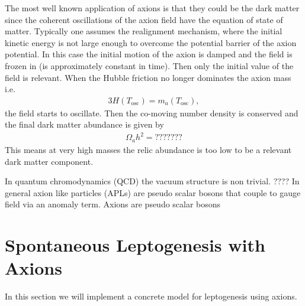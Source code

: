 \documentclass[13pt,a4paper,twoside,titlepage]{article}
\begin{document}
The most well known application of axions is that they could be the dark matter since
the coherent oscillations of the axion field have the equation of state of matter.
Typically one assumes the realignment mechanism, where the initial kinetic energy is not large enough to overcome the potential barrier of the axion potential. In this case the initial motion of the axion is damped and the field is frozen in (is approximately constant in time). Then only the initial value of the field is relevant.
When the Hubble friction no longer dominates the axion mass i.e.
\begin{align}
    3H(T_\mathrm{osc}) = m_a(T_\mathrm{osc}),
\end{align}
the field starts to oscillate.
Then the co-moving number density is conserved and the final dark matter abundance is given by
\begin{align}
    \Omega_a h^2 = ???????
\end{align}
This means at very high masses the relic abundance is too low to be a relevant dark matter component.

In quantum chromodynamics (QCD) the vacuum structure is non trivial.
????
In general axion like particles (APLs) are pseudo scalar bosons that couple
to gauge field via an anomaly term.
Axions are pseudo scalar bosons



\section{Spontaneous Leptogenesis with Axions}
\label{sec:spont_bg_lepto_with_axions}



In this section we will implement a concrete model for leptogenesis using axions.
\end{document}
